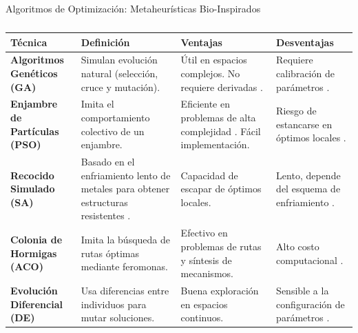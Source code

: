 \documentclass[xcolor={table,dvipsnames}]{beamer}
\begin{document}
\begin{frame}{Algoritmos de Optimizaci\'on: Metaheur\'isticas Bio-Inspirados}
\begin{table}
\centering
    \tiny
    \renewcommand{\arraystretch}{1.4}
    \begin{tabularx}{\textwidth}{|>{\raggedright\arraybackslash}p{2cm}|X|X|X|}
        \hline
        \rowcolor[HTML]{C0C0C0}
        \textbf{T\'ecnica} & \textbf{Definici\'on} & \textbf{Ventajas} & \textbf{Desventajas} \\ \hline

        \textbf{Algoritmos Gen\'eticos (GA)} & Simulan evoluci\'on natural (selecci\'on, cruce y mutaci\'on). & \'Util en espacios complejos. No requiere derivadas \cite{valencia1997optimizacion}. & Requiere calibraci\'on de par\'ametros \cite{zheng2024genetic}. \\ \hline

        \textbf{Enjambre de Part\'iculas (PSO)} & Imita el comportamiento colectivo de un enjambre. & Eficiente en problemas de alta complejidad \cite{lopez2014evaluacion}. F\'acil implementaci\'on. & Riesgo de estancarse en \'optimos locales \cite{zhang2015}. \\ \hline

        \textbf{Recocido Simulado (SA)} & Basado en el enfriamiento lento de metales para obtener estructuras resistentes \cite{abarca2015aplicaciones}. & Capacidad de escapar de \'optimos locales. & Lento, depende del esquema de enfriamiento \cite{centeno2016recocido}. \\ \hline

        \textbf{Colonia de Hormigas (ACO)} & Imita la b\'usqueda de rutas \'optimas mediante feromonas. & Efectivo en problemas de rutas y s\'intesis de mecanismos. & Alto costo computacional \cite{carlos2024}. \\ \hline

        \textbf{Evoluci\'on Diferencial (DE)} & Usa diferencias entre individuos para mutar soluciones. & Buena exploraci\'on en espacios continuos. & Sensible a la configuraci\'on de par\'ametros \cite{alonso2017}. \\ \hline
    \end{tabularx}
    \caption{}
    \label{tab:alg_meta}
\end{table}
\end{frame}

\end{document}
